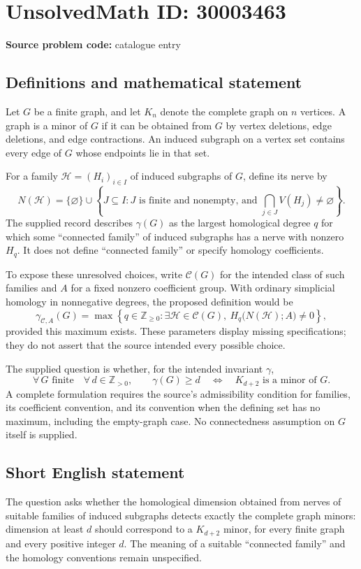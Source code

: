 \documentclass[11pt]{article}
\newcommand{\Z}{\mathbb{Z}}
\begin{document}
\section*{UnsolvedMath ID: 30003463}
\textbf{Source problem code:} catalogue entry
\subsection{Definitions and mathematical statement}
Let \(G\) be a finite graph, and let \(K_n\) denote the complete graph on \(n\) vertices. A graph is a minor of \(G\) if it can be obtained from \(G\) by vertex deletions, edge deletions, and edge contractions. An induced subgraph on a vertex set contains every edge of \(G\) whose endpoints lie in that set.

For a family \(\mathcal H=(H_i)_{i\in I}\) of induced subgraphs of \(G\), define its nerve by
\[
N(\mathcal H)=\{\varnothing\}\cup\left\{J\subseteq I: J\text{ is finite and nonempty, and }\bigcap_{j\in J}V(H_j)\ne\varnothing\right\}.
\]
The supplied record describes \(\gamma(G)\) as the largest homological degree \(q\) for which some ``connected family'' of induced subgraphs has a nerve with nonzero \(H_q\). It does not define ``connected family'' or specify homology coefficients.

To expose these unresolved choices, write \(\mathcal C(G)\) for the intended class of such families and \(A\) for a fixed nonzero coefficient group. With ordinary simplicial homology in nonnegative degrees, the proposed definition would be
\[
\gamma_{\mathcal C,A}(G)=\max\left\{q\in\Z_{\ge0}:\exists\mathcal H\in\mathcal C(G),\ H_q\bigl(N(\mathcal H);A\bigr)\ne0\right\},
\]
provided this maximum exists. These parameters display missing specifications; they do not assert that the source intended every possible choice.

The supplied question is whether, for the intended invariant \(\gamma\),
\[
\forall\,G\text{ finite}\quad\forall\,d\in\Z_{>0},\qquad
\gamma(G)\ge d\quad\Longleftrightarrow\quad K_{d+2}\text{ is a minor of }G.
\]
A complete formulation requires the source's admissibility condition for families, its coefficient convention, and its convention when the defining set has no maximum, including the empty-graph case. No connectedness assumption on \(G\) itself is supplied.
\subsection{Short English statement}
The question asks whether the homological dimension obtained from nerves of suitable families of induced subgraphs detects exactly the complete graph minors: dimension at least \(d\) should correspond to a \(K_{d+2}\) minor, for every finite graph and every positive integer \(d\). The meaning of a suitable ``connected family'' and the homology conventions remain unspecified.
\end{document}
